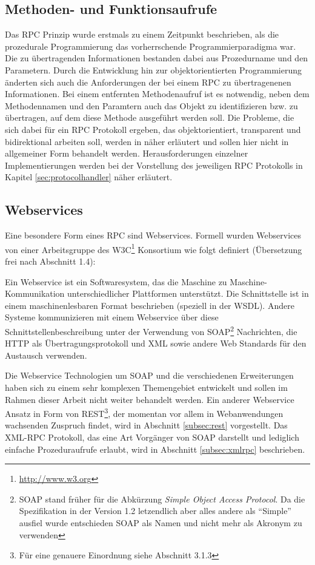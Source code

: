 \subsection{Methoden- und Funktionsaufrufe}
Das \ac{RPC} Prinzip wurde erstmals zu einem Zeitpunkt beschrieben, als die
prozedurale Programmierung das vorherrschende Programmierparadigma war. Die zu
übertragenden Informationen bestanden dabei aus Prozedurname und den Parametern.
Durch die Entwicklung hin zur objektorientierten Programmierung änderten sich
auch die Anforderungen der bei einem \ac{RPC} zu übertragenenen Informationen.
Bei einem entfernten Methodenaufruf ist es notwendig, neben dem Methodennamen
und den Paramtern auch das Objekt zu identifizieren bzw. zu übertragen, auf dem
diese Methode ausgeführt werden soll. Die Probleme, die sich dabei für ein \ac{RPC}
Protokoll ergeben, das objektorientiert, transparent und bidirektional arbeiten
soll, werden in \cite{waldo:1994} näher erläutert und sollen hier nicht in
allgemeiner Form behandelt werden. Herausforderungen einzelner Implementierungen
werden bei der Vorstellung des jeweiligen \ac{RPC} Protokolls in Kapitel
\ref{sec:protocolhandler} näher erläutert.

\subsection{Webservices}
Eine besondere Form eines \ac{RPC} sind Webservices. Formell wurden
Webservices von einer Arbeitsgruppe des W3C\footnote{\url{http://www.w3.org}}
Konsortium wie folgt definiert (Übersetzung frei nach \cite{mcCabe:2004}
Abschnitt 1.4):

Ein Webservice ist ein Softwaresystem, das die Maschine zu
Maschine-Kommunikation unterschiedlicher Plattformen unterstützt. Die Schnittstelle ist in einem
maschinenlesbaren Format beschrieben (speziell in der \ac{WSDL}). Andere Systeme
kommunizieren mit einem Webservice über diese Schnittstellenbeschreibung unter
der Verwendung von SOAP\footnote{SOAP stand früher für die Abkürzung \emph{Simple
Object Access Protocol}. Da die Spezifikation in der Version 1.2 letzendlich aber
alles andere als "`Simple"' ausfiel wurde entschieden SOAP als Namen und nicht
mehr als Akronym zu verwenden} Nachrichten, die HTTP als Übertragungsprotokoll
und XML sowie andere Web Standards für den Austausch verwenden.

Die Webservice Technologien um SOAP und die verschiedenen Erweiterungen haben
sich zu einem sehr komplexen Themengebiet entwickelt und sollen im Rahmen dieser
Arbeit nicht weiter behandelt werden. Ein anderer Webservice Ansatz in Form von
\ac{REST}\footnote{Für eine genauere Einordnung siehe \cite{mcCabe:2004}
Abschnitt 3.1.3}, der momentan vor allem in Webanwendungen wachsenden Zuspruch
findet, wird in Abschnitt \ref{subsec:rest} vorgestellt. Das XML-RPC Protokoll,
das eine Art Vorgänger von SOAP darstellt und lediglich einfache
Prozeduraufrufe erlaubt, wird in Abschnitt \ref{subsec:xmlrpc} beschrieben.

